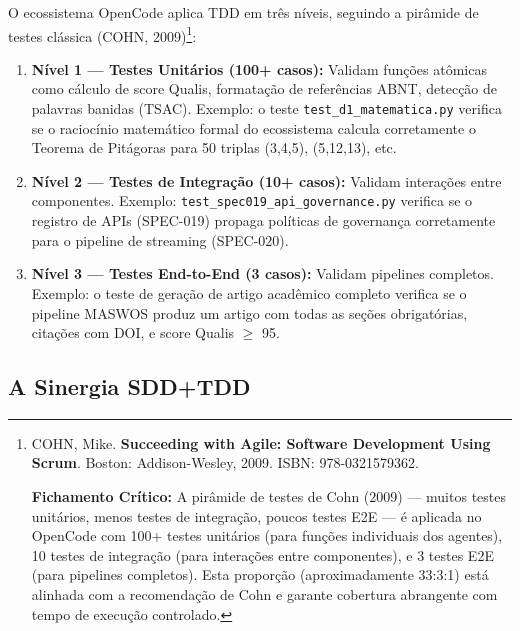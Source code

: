 O ecossistema OpenCode aplica TDD em três níveis, seguindo a pirâmide de testes clássica (COHN, 2009)\footnote{
  COHN, Mike. \textbf{Succeeding with Agile: Software Development Using Scrum}. Boston: Addison-Wesley, 2009. ISBN: 978-0321579362.

  \textbf{Fichamento Crítico:} A pirâmide de testes de Cohn (2009) --- muitos testes unitários, menos testes de integração, poucos testes E2E --- é aplicada no OpenCode com 100+ testes unitários (para funções individuais dos agentes), 10 testes de integração (para interações entre componentes), e 3 testes E2E (para pipelines completos). Esta proporção (aproximadamente 33:3:1) está alinhada com a recomendação de Cohn e garante cobertura abrangente com tempo de execução controlado.
}:

\begin{enumerate}
  \item \textbf{Nível 1 --- Testes Unitários (100+ casos):} Validam funções atômicas como cálculo de score Qualis, formatação de referências ABNT, detecção de palavras banidas (TSAC). Exemplo: o teste \texttt{test\_d1\_matematica.py} verifica se o raciocínio matemático formal do ecossistema calcula corretamente o Teorema de Pitágoras para 50 triplas (3,4,5), (5,12,13), etc.

  \item \textbf{Nível 2 --- Testes de Integração (10+ casos):} Validam interações entre componentes. Exemplo: \texttt{test\_spec019\_api\_governance.py} verifica se o registro de APIs (SPEC-019) propaga políticas de governança corretamente para o pipeline de streaming (SPEC-020).

  \item \textbf{Nível 3 --- Testes End-to-End (3 casos):} Validam pipelines completos. Exemplo: o teste de geração de artigo acadêmico completo verifica se o pipeline MASWOS produz um artigo com todas as seções obrigatórias, citações com DOI, e score Qualis $\geq$ 95.
\end{enumerate}

\subsection{A Sinergia SDD+TDD}


